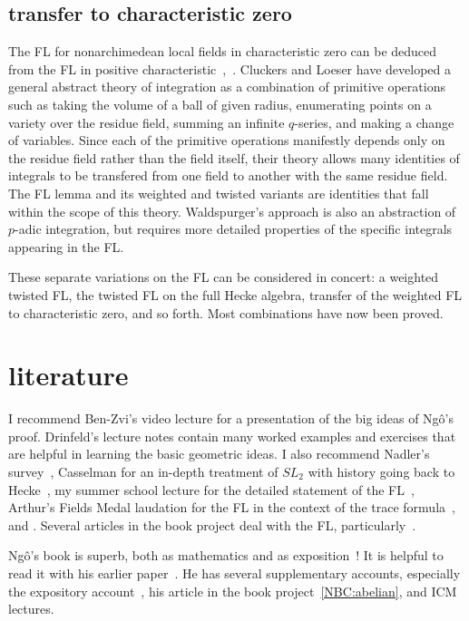 \documentclass[brochure,english,12pt]{bourbaki}
\begin{document}
\subsection{transfer to characteristic zero}

The FL for nonarchimedean local fields in characteristic zero can be
deduced from the FL in positive
characteristic~\cite{Wald:2006},~\cite{CHL:2010}.  Cluckers and Loeser
have developed a general abstract theory of integration as a
combination of primitive operations such as taking the volume of a
ball of given radius, enumerating points on a variety over the residue
field, summing an infinite $q$-series, and making a change of
variables.  Since each of the primitive operations manifestly depends
only on the residue field rather than the field itself, their theory
allows many identities of integrals to be transfered from one field to
another with the same residue field.  The FL lemma and its weighted
and twisted variants are identities that fall within the scope of this
theory.  Waldspurger's approach is also an abstraction
of $p$-adic integration, but requires more detailed
properties of the specific integrals appearing in the FL.

These separate variations on the FL can be considered in concert: a
weighted twisted FL, the twisted FL on the full Hecke algebra,
transfer of the weighted FL to characteristic zero, and so forth.
Most combinations have now been proved.

\section{literature}

I recommend Ben-Zvi's video lecture for a presentation of the big
ideas of Ng\^o's proof.  Drinfeld's lecture notes contain many worked
examples and exercises that are helpful in learning the basic
geometric ideas.  I also recommend Nadler's survey~\cite{Nadler:2010},
Casselman for an in-depth treatment of $SL_2$ with history going back
to Hecke~\cite{Cass:2010}, my summer school lecture for the detailed
statement of the FL~\cite{Hales:FL-statement}, Arthur's Fields Medal laudation for
the FL in the context of the trace formula~\cite{Arthur:2010}, and
\cite{CHLaumon:2010}.  Several articles in the book project
\cite{Harris:book-project} deal with the FL,
particularly~\cite{DN:2010}.


Ng\^o's book is superb, both as mathematics and as
exposition~\cite{NBC:2010}!  It is helpful to read it with his earlier
paper~\cite{NBC:2006}.  He has several supplementary accounts,
especially the expository account~\cite{NBC:report}, his article in the book
project~\ref{NBC:abelian}, and ICM lectures.
\end{document}
